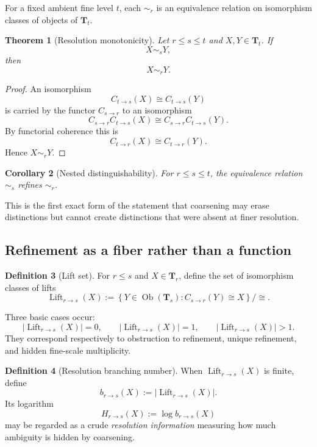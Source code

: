 \documentclass[11pt]{article}
\newtheorem{theorem}{Theorem}[section]
\newtheorem{corollary}[theorem]{Corollary}
\theoremstyle{definition}
\newtheorem{definition}[theorem]{Definition}
\theoremstyle{remark}
\newcommand{\Tcat}{\mathbf T}
\newcommand{\Ob}{\operatorname{Ob}}
\newcommand{\Lift}{\operatorname{Lift}}
\begin{document}
For a fixed ambient fine level $t$, each $\sim_r$ is an equivalence relation on isomorphism classes of objects of $\Tcat_t$.

\begin{theorem}[Resolution monotonicity]\label{thm:resolution-monotonicity}
Let $r\le s\le t$ and $X,Y\in\Tcat_t$. If
\[
X\sim_sY,
\]
then
\[
X\sim_rY.
\]
\end{theorem}

\begin{proof}
An isomorphism
\[
C_{t\to s}(X)\cong C_{t\to s}(Y)
\]
is carried by the functor $C_{s\to r}$ to an isomorphism
\[
C_{s\to r}C_{t\to s}(X)
\cong
C_{s\to r}C_{t\to s}(Y).
\]
By functorial coherence this is
\[
C_{t\to r}(X)\cong C_{t\to r}(Y).
\]
Hence $X\sim_rY$.
\end{proof}

\begin{corollary}[Nested distinguishability]\label{cor:nested}
For $r\le s\le t$, the equivalence relation $\sim_s$ refines $\sim_r$.
\end{corollary}

This is the first exact form of the statement that coarsening may erase distinctions but cannot create distinctions that were absent at finer resolution.

\subsection{Refinement as a fiber rather than a function}

\begin{definition}[Lift set]
For $r\le s$ and $X\in\Tcat_r$, define the set of isomorphism classes of lifts
\[
\Lift_{r\to s}(X)
:=
\left\{
Y\in\Ob(\Tcat_s):C_{s\to r}(Y)\cong X
\right\}/\cong.
\]
\end{definition}

Three basic cases occur:
\[
|\Lift_{r\to s}(X)|=0,
\qquad
|\Lift_{r\to s}(X)|=1,
\qquad
|\Lift_{r\to s}(X)|>1.
\]
They correspond respectively to obstruction to refinement, unique refinement, and hidden fine-scale multiplicity.

\begin{definition}[Resolution branching number]
When $\Lift_{r\to s}(X)$ is finite, define
\[
b_{r\to s}(X):=|\Lift_{r\to s}(X)|.
\]
Its logarithm
\[
H_{r\to s}(X):=\log b_{r\to s}(X)
\]
may be regarded as a crude \emph{resolution information} measuring how much ambiguity is hidden by coarsening.
\end{definition}
\end{document}
